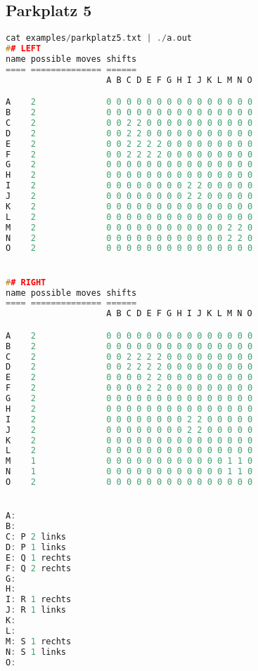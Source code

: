 \documentclass[a4paper,10pt,ngerman]{scrartcl}
\begin{document}
\subsection*{Parkplatz 5}
\begin{lstlisting}[language=C++]
cat examples/parkplatz5.txt | ./a.out
## LEFT
name possible moves shifts
==== ============== ======
                    A B C D E F G H I J K L M N O

A    2              0 0 0 0 0 0 0 0 0 0 0 0 0 0 0
B    2              0 0 0 0 0 0 0 0 0 0 0 0 0 0 0
C    2              0 0 2 2 0 0 0 0 0 0 0 0 0 0 0
D    2              0 0 2 2 0 0 0 0 0 0 0 0 0 0 0
E    2              0 0 2 2 2 2 0 0 0 0 0 0 0 0 0
F    2              0 0 2 2 2 2 0 0 0 0 0 0 0 0 0
G    2              0 0 0 0 0 0 0 0 0 0 0 0 0 0 0
H    2              0 0 0 0 0 0 0 0 0 0 0 0 0 0 0
I    2              0 0 0 0 0 0 0 0 2 2 0 0 0 0 0
J    2              0 0 0 0 0 0 0 0 2 2 0 0 0 0 0
K    2              0 0 0 0 0 0 0 0 0 0 0 0 0 0 0
L    2              0 0 0 0 0 0 0 0 0 0 0 0 0 0 0
M    2              0 0 0 0 0 0 0 0 0 0 0 0 2 2 0
N    2              0 0 0 0 0 0 0 0 0 0 0 0 2 2 0
O    2              0 0 0 0 0 0 0 0 0 0 0 0 0 0 0


## RIGHT
name possible moves shifts
==== ============== ======
                    A B C D E F G H I J K L M N O

A    2              0 0 0 0 0 0 0 0 0 0 0 0 0 0 0
B    2              0 0 0 0 0 0 0 0 0 0 0 0 0 0 0
C    2              0 0 2 2 2 2 0 0 0 0 0 0 0 0 0
D    2              0 0 2 2 2 2 0 0 0 0 0 0 0 0 0
E    2              0 0 0 0 2 2 0 0 0 0 0 0 0 0 0
F    2              0 0 0 0 2 2 0 0 0 0 0 0 0 0 0
G    2              0 0 0 0 0 0 0 0 0 0 0 0 0 0 0
H    2              0 0 0 0 0 0 0 0 0 0 0 0 0 0 0
I    2              0 0 0 0 0 0 0 0 2 2 0 0 0 0 0
J    2              0 0 0 0 0 0 0 0 2 2 0 0 0 0 0
K    2              0 0 0 0 0 0 0 0 0 0 0 0 0 0 0
L    2              0 0 0 0 0 0 0 0 0 0 0 0 0 0 0
M    1              0 0 0 0 0 0 0 0 0 0 0 0 1 1 0
N    1              0 0 0 0 0 0 0 0 0 0 0 0 1 1 0
O    2              0 0 0 0 0 0 0 0 0 0 0 0 0 0 0


A:
B:
C: P 2 links
D: P 1 links
E: Q 1 rechts
F: Q 2 rechts
G:
H:
I: R 1 rechts
J: R 1 links
K:
L:
M: S 1 rechts
N: S 1 links
O:
\end{lstlisting}
\end{document}
